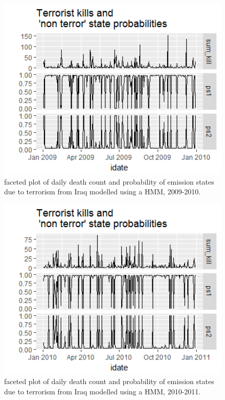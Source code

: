 \begin{figure}[t]
\includegraphics[width=15cm]{Peters_experiment_markdown_files/figure-latex/Rplot02_2009_2010.png}
\caption{faceted plot of daily death count and probability of emission states due to terrorism from Iraq modelled using a HMM, 2009-2010.}
\label{fig:Rplot02_2009_2010}
\centering
\end{figure}

\begin{figure}[t]
\includegraphics[width=15cm]{Peters_experiment_markdown_files/figure-latex/Rplot02_2010_2011_HMM.png}
\caption{faceted plot of daily death count and probability of emission states due to terrorism from Iraq modelled using a HMM, 2010-2011.}
\label{fig:Rplot02_2010_2011_HMM}
\centering
\end{figure}

